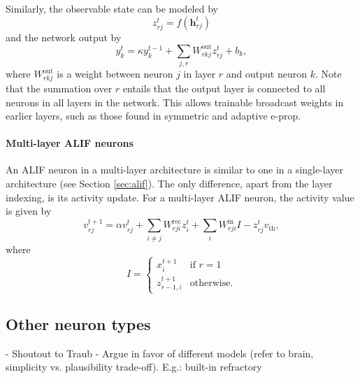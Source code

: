         Similarly, the observable state can be modeled by
        \begin{equation}\label{eq:ml_model_obs}
        z^t_{rj} = f\left(\mathbf{h}_{rj}^t\right)
        \end{equation}
        and the network output by
        \begin{equation}\label{eq:ml_model_obs}
        y^t_k = \kappa y^{t-1}_k + \sum_{j,r}W^\text{out}_{rkj}z_{rj}^t + b_k,
        \end{equation}
        where $W^\text{out}_{rkj}$ is a weight between neuron $j$ in layer $r$ and output neuron $k$.
        Note that the summation over $r$ entails that the output layer is connected to all neurons in all layers in the network.
        This allows trainable broadcast weights in earlier layers, such as those found in symmetric and adaptive e-prop.

        \paragraph{Multi-layer ALIF neurons}
        An ALIF neuron in a multi-layer architecture is similar to one in a single-layer architecture (see Section \ref{sec:alif}).
        The only difference, apart from the layer indexing, is its activity update.
        For a multi-layer ALIF neuron, the activity value is given by
        \begin{equation}\label{eq:ml_alifV}
        v^{t+1}_{rj} = \alpha v_{rj}^t + \sum_{i\neq j}W^\text{rec}_{rji}z_i^t + \sum_i W^\text{in}_{rji}I - z_{rj}^tv_
        \text{th},
        \end{equation}
        where
        \begin{equation}
        I = \begin{cases}
        	x^{t+1}_i       &\mbox{if } r = 1 \\
            z^{t+1}_{r-1,i} &\mbox{otherwise.}
            \end{cases}
        \end{equation}


	\subsection{Other neuron types}
		\begin{tcolorbox}[colback=orange]

		- Shoutout to Traub
		- Argue in favor of different models (refer to brain, simplicity vs. plausibility trade-off). E.g.: built-in refractory

		\end{tcolorbox}
